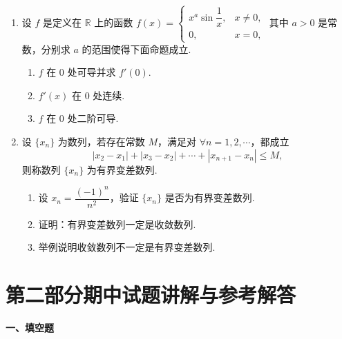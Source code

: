 \documentclass[a4paper,11pt]{ctexart}
\begin{document}
\begin{enumerate}[label=\arabic*., start=16, leftmargin=2em, itemsep=0.9em, topsep=0.5em]
  \item 设 $f$ 是定义在 $\mathbb{R}$ 上的函数 $f(x)=\begin{cases} x^a\sin\dfrac{1}{x}, & x\neq 0, \\ 0, & x=0, \end{cases}$ 其中 $a>0$ 是常数，分别求 $a$ 的范围使得下面命题成立.
  \begin{enumerate}[label=(\arabic*), leftmargin=2.2em, itemsep=0.25em, topsep=0.3em]
    \item $f$ 在 $0$ 处可导并求 $f'(0)$.
    \item $f'(x)$ 在 $0$ 处连续.
    \item $f$ 在 $0$ 处二阶可导.
  \end{enumerate}

  \item 设 $\{x_n\}$ 为数列，若存在常数 $M$，满足对 $\forall n=1,2,\cdots$，都成立
  \[
    |x_2-x_1|+|x_3-x_2|+\cdots+|x_{n+1}-x_n|\le M,
  \]
  则称数列 $\{x_n\}$ 为有界变差数列.
  \begin{enumerate}[label=(\arabic*), leftmargin=2.2em, itemsep=0.25em, topsep=0.3em]
    \item 设 $x_n=\dfrac{(-1)^n}{n^2}$，验证 $\{x_n\}$ 是否为有界变差数列.
    \item 证明：有界变差数列一定是收敛数列.
    \item 举例说明收敛数列不一定是有界变差数列.
  \end{enumerate}
\end{enumerate}

\newpage
\section*{第二部分\quad 期中试题讲解与参考解答}

\textbf{一、填空题}
\end{document}
